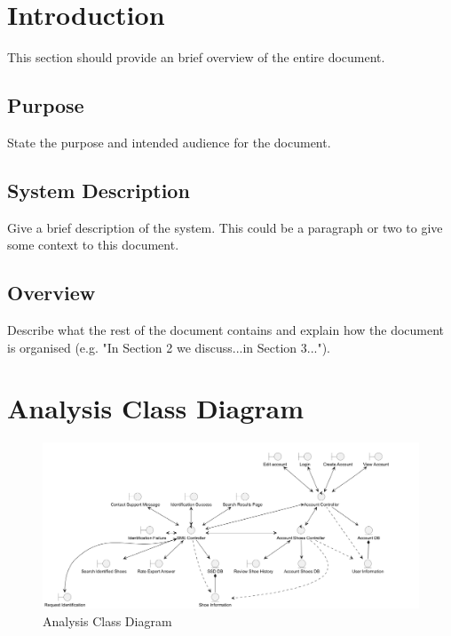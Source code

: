 \documentclass[]{article}
\begin{document}
\newpage
\section{Introduction}
\label{sec:introduction}

This section should provide an brief overview of the entire document.

\subsection{Purpose}
\label{sub:purpose}
State the purpose and intended audience for the document.

\subsection{System Description}
\label{sub:system_description}
Give a brief description of the system. This could be a paragraph or two to give some context to this document.


\subsection{Overview}
\label{sub:overview}
Describe what the rest of the document contains and explain how the document is organised (e.g. "In Section 2 we discuss...in Section 3...").



\section{Analysis Class Diagram}
\label{sec:analysis_class_diagram}
\begin{figure}[h]
	\includegraphics[width = \textwidth]{analysisClassDiagram.png}
	\caption{Analysis Class Diagram}\label{Fig:Q1}
  \end{figure}
\end{document}
